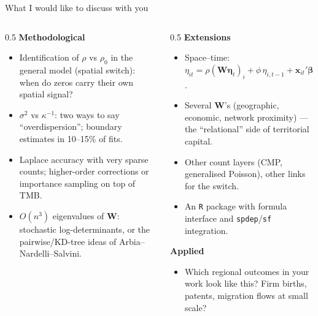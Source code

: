 \documentclass[10pt,aspectratio=169]{beamer}
\newcommand{\bW}{\mathbf{W}}
\newcommand{\bbeta}{\boldsymbol{\beta}}
\begin{document}
\begin{frame}{What I would like to discuss with you}
  \small
  \begin{columns}[T]
    \begin{column}{0.5\textwidth}
      \textbf{Methodological}
      \begin{itemize}\setlength{\itemsep}{0.4em}
        \item Identification of $\rho$ vs $\rho_0$ in the general model (spatial switch): when do zeros carry their own spatial signal?
        \item $\sigma^2$ vs $\kappa^{-1}$: two ways to say ``overdispersion''; boundary estimates in 10--15\% of fits.
        \item Laplace accuracy with very sparse counts; higher-order corrections or importance sampling on top of TMB.
        \item $O(n^3)$ eigenvalues of $\bW$: stochastic log-determinants, or the pairwise/KD-tree ideas of Arbia--Nardelli--Salvini.
      \end{itemize}
    \end{column}
    \begin{column}{0.5\textwidth}
      \textbf{Extensions}
      \begin{itemize}\setlength{\itemsep}{0.4em}
        \item Space--time: $\eta_{it} = \rho(\bW\boldsymbol\eta_t)_i + \phi\,\eta_{i,t-1} + \mathbf x_{it}'\bbeta + u_i + \nu_t$.
        \item Several $\bW$'s (geographic, economic, network proximity) --- the ``relational'' side of territorial capital.
        \item Other count layers (CMP, generalised Poisson), other links for the switch.
        \item An \texttt{R} package with formula interface and \texttt{spdep}/\texttt{sf} integration.
      \end{itemize}
      \vspace{0.3em}
      \textbf{Applied}
      \begin{itemize}
        \item Which regional outcomes in your work look like this? Firm births, patents, migration flows at small scale?
      \end{itemize}
    \end{column}
  \end{columns}
\end{frame}
\end{document}
